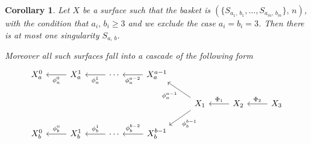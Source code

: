 \documentclass[12pt]{amsbook}
\theoremstyle{plain}
\newtheorem{cor}[thm]{Corollary}
\begin{document}
\begin{cor}\label{doublecurve}
Let $X$ be a surface such that the basket is  $(\{ S_{a_1, \, b_1}, \dots , S_{a_m, \, b_m} \}, \, n )$, with the condition that $a_i, \, b_i \geq 3$ and we exclude the case $a_i = b_i = 3$. Then there is at most one singularity $S_{a, \, b}$.


Moreover all such surfaces fall into a cascade of the following form
\[
\begin{tikzcd}
X_a^0 & X_a^1 \arrow[l, "\phi_a^0"]  & \cdots \arrow[l, "\phi_a^1"]  & X_a^{a-1}  \arrow[l, "\phi_a^{a-2}"] &                                                           &                        \\
      &                              &                               &                                      & X_1 \arrow[ld, "\phi_b^{b-1}"] \arrow[lu, "\phi_a^{a-1}"] & X_2 \arrow[l, "\Phi_1"'] & X_3 \arrow[l, "\Phi_2"']\\
X_b^0 & X_b^1 \arrow[l, "\phi_b^0"'] & \cdots \arrow[l, "\phi_b^1"'] & X_b^{b-1} \arrow[l, "\phi_b^{b-2}"'] &                                                           &                       
\end{tikzcd}
\]
\end{cor}
\end{document}
